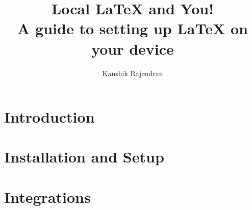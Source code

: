 \documentclass[titlepage]{article}
\title{\textbf{Local \LaTeX{} and You!} \\ A guide to setting up \LaTeX{} on your device}
\author{Kaushik Rajendran}
\begin{document}
\maketitle
\tableofcontents
\newpage

\section{Introduction}

\clearpage

\section{Installation and Setup}

\clearpage

\section{Integrations}

\clearpage
\end{document}
